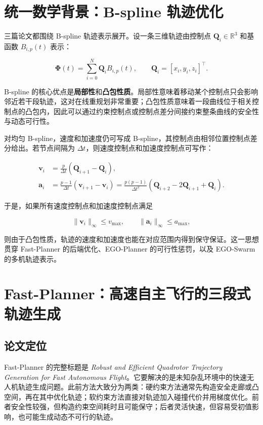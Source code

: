 \documentclass[UTF8,a4paper,12pt]{ctexart}
\newcommand{\traj}{\boldsymbol{\Phi}}
\newcommand{\ctrl}{\mathbf{Q}}
\newcommand{\vel}{\mathbf{v}}
\newcommand{\acc}{\mathbf{a}}
\newcommand{\R}{\mathbb{R}}
\begin{document}
\section{统一数学背景：B-spline 轨迹优化}

三篇论文都围绕 B-spline 轨迹表示展开。设一条三维轨迹由控制点 $\ctrl_i\in\R^3$ 和基函数 $B_{i,p}(t)$ 表示：

\begin{equation}
  \traj(t)=\sum_{i=0}^{N}\ctrl_i B_{i,p}(t), \qquad \ctrl_i=[x_i,y_i,z_i]^\top .
\end{equation}

B-spline 的核心优点是\textbf{局部性}和\textbf{凸包性质}。局部性意味着移动某个控制点只会影响邻近若干段轨迹，这对在线重规划非常重要；凸包性质意味着一段曲线位于相关控制点的凸包内，因此可以通过约束控制点或控制点差分间接约束整条曲线的安全性与动态可行性。

对均匀 B-spline，速度和加速度仍可写成 B-spline，其控制点由相邻位置控制点差分给出。若节点间隔为 $\Delta t$，则速度控制点和加速度控制点可写作：

\begin{align}
  \vel_i &= \frac{p}{\Delta t}(\ctrl_{i+1}-\ctrl_i),\\
  \acc_i &= \frac{p-1}{\Delta t}(\vel_{i+1}-\vel_i)
  =\frac{p(p-1)}{\Delta t^2}(\ctrl_{i+2}-2\ctrl_{i+1}+\ctrl_i).
\end{align}

于是，如果所有速度控制点和加速度控制点满足

\begin{equation}
  \|\vel_i\|_\infty \le v_{\max}, \qquad
  \|\acc_i\|_\infty \le a_{\max},
\end{equation}

则由于凸包性质，轨迹的速度和加速度也能在对应范围内得到保守保证。这一思想贯穿 Fast-Planner 的后端优化、EGO-Planner 的可行性惩罚，以及 EGO-Swarm 的多机轨迹表示。

\section{Fast-Planner：高速自主飞行的三段式轨迹生成}

\subsection{论文定位}

Fast-Planner 的完整标题是 \textit{Robust and Efficient Quadrotor Trajectory Generation for Fast Autonomous Flight}。它要解决的是未知杂乱环境中的快速无人机轨迹生成问题。此前方法大致分为两类：硬约束方法通常先构造安全走廊或凸空间，再在其中优化轨迹；软约束方法直接对轨迹加入碰撞代价并用梯度优化。前者安全性较强，但构造约束空间耗时且可能保守；后者灵活快速，但容易受初值影响，也可能生成动态不可行的轨迹。
\end{document}
